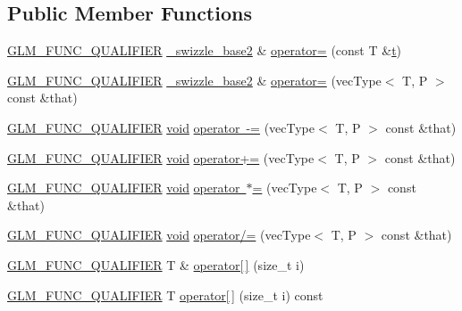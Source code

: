 \subsection*{Public Member Functions}
\begin{DoxyCompactItemize}
\item 
\mbox{\hyperlink{setup_8hpp_a33fdea6f91c5f834105f7415e2a64407}{G\+L\+M\+\_\+\+F\+U\+N\+C\+\_\+\+Q\+U\+A\+L\+I\+F\+I\+ER}} \mbox{\hyperlink{structglm_1_1detail_1_1__swizzle__base2}{\+\_\+swizzle\+\_\+base2}} \& \mbox{\hyperlink{structglm_1_1detail_1_1__swizzle__base2_ad10ec021fc0dfb82772b78b2d8fbdde5}{operator=}} (const T \&\mbox{\hyperlink{glad_8h_aef9f00bf06d58b8db7e501e287488401}{t}})
\item 
\mbox{\hyperlink{setup_8hpp_a33fdea6f91c5f834105f7415e2a64407}{G\+L\+M\+\_\+\+F\+U\+N\+C\+\_\+\+Q\+U\+A\+L\+I\+F\+I\+ER}} \mbox{\hyperlink{structglm_1_1detail_1_1__swizzle__base2}{\+\_\+swizzle\+\_\+base2}} \& \mbox{\hyperlink{structglm_1_1detail_1_1__swizzle__base2_ab4f91d3891e4f4e0acb1e96364527c2b}{operator=}} (vec\+Type$<$ T, P $>$ const \&that)
\item 
\mbox{\hyperlink{setup_8hpp_a33fdea6f91c5f834105f7415e2a64407}{G\+L\+M\+\_\+\+F\+U\+N\+C\+\_\+\+Q\+U\+A\+L\+I\+F\+I\+ER}} \mbox{\hyperlink{glad_8h_a950fc91edb4504f62f1c577bf4727c29}{void}} \mbox{\hyperlink{structglm_1_1detail_1_1__swizzle__base2_a33ee76f7d3166420cefe42d25654e794}{operator -\/=}} (vec\+Type$<$ T, P $>$ const \&that)
\item 
\mbox{\hyperlink{setup_8hpp_a33fdea6f91c5f834105f7415e2a64407}{G\+L\+M\+\_\+\+F\+U\+N\+C\+\_\+\+Q\+U\+A\+L\+I\+F\+I\+ER}} \mbox{\hyperlink{glad_8h_a950fc91edb4504f62f1c577bf4727c29}{void}} \mbox{\hyperlink{structglm_1_1detail_1_1__swizzle__base2_a20ab7639070ba0bc572b6224d77c1052}{operator+=}} (vec\+Type$<$ T, P $>$ const \&that)
\item 
\mbox{\hyperlink{setup_8hpp_a33fdea6f91c5f834105f7415e2a64407}{G\+L\+M\+\_\+\+F\+U\+N\+C\+\_\+\+Q\+U\+A\+L\+I\+F\+I\+ER}} \mbox{\hyperlink{glad_8h_a950fc91edb4504f62f1c577bf4727c29}{void}} \mbox{\hyperlink{structglm_1_1detail_1_1__swizzle__base2_aa1f1b42302141930f442c11738e55f66}{operator $\ast$=}} (vec\+Type$<$ T, P $>$ const \&that)
\item 
\mbox{\hyperlink{setup_8hpp_a33fdea6f91c5f834105f7415e2a64407}{G\+L\+M\+\_\+\+F\+U\+N\+C\+\_\+\+Q\+U\+A\+L\+I\+F\+I\+ER}} \mbox{\hyperlink{glad_8h_a950fc91edb4504f62f1c577bf4727c29}{void}} \mbox{\hyperlink{structglm_1_1detail_1_1__swizzle__base2_adadee6f3dfed945dab83ecd0a2805756}{operator/=}} (vec\+Type$<$ T, P $>$ const \&that)
\item 
\mbox{\hyperlink{setup_8hpp_a33fdea6f91c5f834105f7415e2a64407}{G\+L\+M\+\_\+\+F\+U\+N\+C\+\_\+\+Q\+U\+A\+L\+I\+F\+I\+ER}} T \& \mbox{\hyperlink{structglm_1_1detail_1_1__swizzle__base2_aa2ddf6ceceefa8a98ef2f7128ce57049}{operator\mbox{[}$\,$\mbox{]}}} (size\+\_\+t i)
\item 
\mbox{\hyperlink{setup_8hpp_a33fdea6f91c5f834105f7415e2a64407}{G\+L\+M\+\_\+\+F\+U\+N\+C\+\_\+\+Q\+U\+A\+L\+I\+F\+I\+ER}} T \mbox{\hyperlink{structglm_1_1detail_1_1__swizzle__base2_a32bcfa5111def1015414df50e7f2297f}{operator\mbox{[}$\,$\mbox{]}}} (size\+\_\+t i) const
\end{DoxyCompactItemize}
